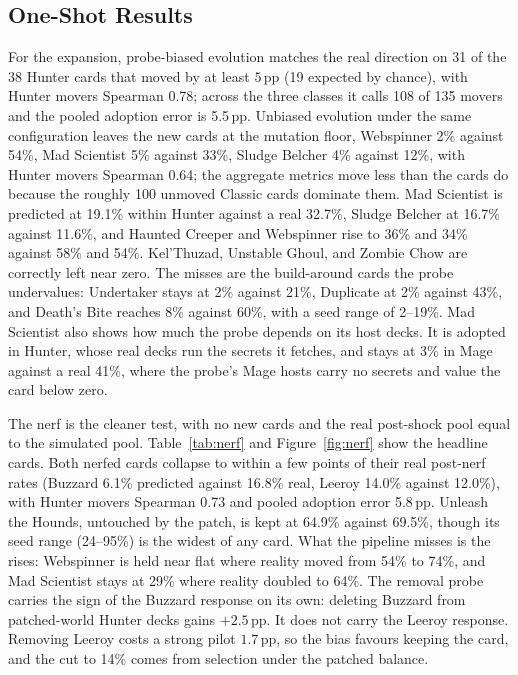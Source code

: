 \documentclass[journal]{IEEEtran}
\newcommand{\pp}{\,\text{pp}}
\begin{document}
\subsection{One-Shot Results}
\label{sec:hsoneshot}

For the expansion, probe-biased evolution matches the real direction on
31 of the 38 Hunter cards that moved by at least $5\pp$ (19 expected by
chance), with Hunter movers Spearman 0.78; across the three classes it
calls 108 of 135 movers and the pooled adoption error is 5.5$\pp$.
Unbiased evolution under the same configuration leaves the new cards at
the mutation floor, Webspinner 2\% against 54\%, Mad Scientist 5\%
against 33\%, Sludge Belcher 4\% against 12\%, with Hunter movers
Spearman 0.64; the aggregate metrics move less than the cards do because
the roughly 100 unmoved Classic cards dominate them. Mad Scientist is predicted at 19.1\% within
Hunter against a real 32.7\%, Sludge Belcher at 16.7\% against 11.6\%,
and Haunted Creeper and Webspinner rise to 36\% and 34\% against 58\% and
54\%. Kel'Thuzad, Unstable Ghoul, and Zombie Chow are correctly left near
zero. The misses are the build-around cards the probe undervalues:
Undertaker stays at 2\% against 21\%, Duplicate at 2\% against 43\%, and
Death's Bite reaches 8\% against 60\%, with a seed range of 2--19\%. Mad
Scientist also shows how much the probe depends on its host decks. It is
adopted in Hunter, whose real decks run the secrets it fetches, and stays
at 3\% in Mage against a real 41\%, where the probe's Mage hosts carry no
secrets and value the card below zero.

The nerf is the cleaner test, with no new cards and the real post-shock
pool equal to the simulated pool. Table~\ref{tab:nerf} and
Figure~\ref{fig:nerf} show the headline cards. Both nerfed cards collapse
to within a few points of their real post-nerf rates (Buzzard 6.1\%
predicted against 16.8\% real, Leeroy 14.0\% against 12.0\%), with Hunter
movers Spearman 0.73 and pooled adoption error 5.8$\pp$. Unleash the
Hounds, untouched by the patch, is kept at 64.9\% against 69.5\%, though
its seed range (24--95\%) is the widest of any card. What the pipeline
misses is the rises: Webspinner is held near flat where reality moved
from 54\% to 74\%, and Mad Scientist stays at 29\% where reality doubled
to 64\%. The removal probe carries the sign of the Buzzard response on
its own: deleting Buzzard from patched-world Hunter decks gains
$+2.5\pp$. It does not carry the Leeroy response. Removing Leeroy costs a
strong pilot $1.7\pp$, so the bias favours keeping the card, and the cut
to 14\% comes from selection under the patched balance.
\end{document}
